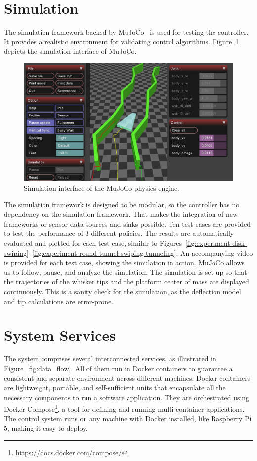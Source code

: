 \section{Simulation}
The simulation framework backed by MuJoCo~\cite{todorov2012mujoco} is used for testing the controller.
It provides a realistic environment for validating control algorithms.
Figure~\ref{fig:mujoco} depicts the simulation interface of MuJoCo.

\begin{figure}
    \centering
    \includegraphics[width=\textwidth]{figures/mujoco}
    \caption{Simulation interface of the MuJoCo physics engine.}
    \label{fig:mujoco}
\end{figure}

The simulation framework is designed to be modular, so the controller has no dependency on the simulation framework.
That makes the integration of new frameworks or sensor data sources and sinks possible.
Ten test cases are provided to test the performance of 3 different policies.
The results are automatically evaluated and plotted for each test case, similar to Figures~\ref{fig:experiment-disk-swiping}--\ref{fig:experiment-round-tunnel-swiping-tunneling}.
An accompanying video is provided for each test case, showing the simulation in action.
MuJoCo allows us to follow, pause, and analyze the simulation.
The simulation is set up so that the trajectories of the whisker tips and the platform center of mass are displayed continuously.
This is a sanity check for the simulation, as the deflection model and tip calculations are error-prone.


\section{System Services}
The system comprises several interconnected services, as illustrated in Figure~\ref{fig:data_flow}.
All of them run in Docker containers to guarantee a consistent and separate environment across different machines.
Docker containers are lightweight, portable, and self-sufficient units that encapsulate all the necessary components to run a software application.
They are orchestrated using Docker Compose\footnote{\url{https://docs.docker.com/compose/}}, a tool for defining and running multi-container applications.
The control system runs on any machine with Docker installed, like Raspberry Pi 5, making it easy to deploy.

